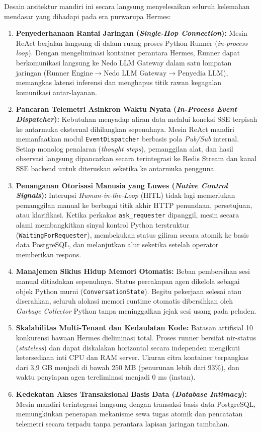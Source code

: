 Desain arsitektur mandiri ini secara langsung menyelesaikan seluruh kelemahan mendasar yang dihadapi pada era purwarupa Hermes:
\begin{enumerate}[label=\alph*.]
  \item \textbf{Penyederhanaan Rantai Jaringan (\textit{Single-Hop Connection}):} Mesin ReAct berjalan langsung di dalam ruang proses Python Runner (\textit{in-process loop}). Dengan mengeliminasi kontainer perantara Hermes, Runner dapat berkomunikasi langsung ke Nedo LLM Gateway dalam satu lompatan jaringan ($\text{Runner Engine} \rightarrow \text{Nedo LLM Gateway} \rightarrow \text{Penyedia LLM}$), memangkas latensi inferensi dan menghapus titik rawan kegagalan komunikasi antar-layanan.
  \item \textbf{Pancaran Telemetri Asinkron Waktu Nyata (\textit{In-Process Event Dispatcher}):} Kebutuhan menyadap aliran data melalui koneksi SSE terpisah ke antarmuka eksternal dihilangkan sepenuhnya. Mesin ReAct mandiri memanfaatkan modul \texttt{EventDispatcher} berbasis pola \textit{Pub/Sub} internal. Setiap monolog penalaran (\textit{thought steps}), pemanggilan alat, dan hasil observasi langsung dipancarkan secara terintegrasi ke Redis Stream dan kanal SSE backend untuk diteruskan seketika ke antarmuka pengguna.
  \item \textbf{Penanganan Otorisasi Manusia yang Luwes (\textit{Native Control Signals}):} Interupsi \textit{Human-in-the-Loop} (HITL) tidak lagi memerlukan pemanggilan manual ke berbagai titik akhir HTTP penundaan, persetujuan, atau klarifikasi. Ketika perkakas \texttt{ask\_requester} dipanggil, mesin secara alami membangkitkan sinyal kontrol Python terstruktur (\texttt{WaitingForRequester}), membekukan status giliran secara atomik ke basis data PostgreSQL, dan melanjutkan alur seketika setelah operator memberikan respons.
  \item \textbf{Manajemen Siklus Hidup Memori Otomatis:} Beban pembersihan sesi manual ditiadakan sepenuhnya. Status percakapan agen dikelola sebagai objek Python murni (\texttt{ConversationState}). Begitu pekerjaan selesai atau diserahkan, seluruh alokasi memori runtime otomatis dibersihkan oleh \textit{Garbage Collector} Python tanpa meninggalkan jejak sesi usang pada peladen.
  \item \textbf{Skalabilitas Multi-Tenant dan Kedaulatan Kode:} Batasan artifisial 10 konkurensi bawaan Hermes dieliminasi total. Proses runner bersifat nir-status (\textit{stateless}) dan dapat diskalakan horizontal secara independen mengikuti ketersediaan inti CPU dan RAM server. Ukuran citra kontainer terpangkas dari 3,9 GB menjadi di bawah 250 MB (penurunan lebih dari 93\%), dan waktu penyiapan agen tereliminasi menjadi 0 ms (instan).
  \item \textbf{Kedekatan Akses Transaksional Basis Data (\textit{Database Intimacy}):} Mesin mandiri terintegrasi langsung dengan transaksi basis data PostgreSQL, memungkinkan penerapan mekanisme sewa tugas atomik dan pencatatan telemetri secara terpadu tanpa perantara lapisan jaringan tambahan.
\end{enumerate}

